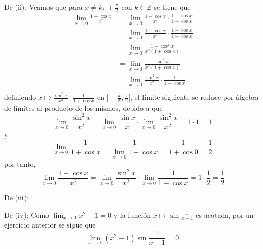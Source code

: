 \documentclass[12pt]{article}
\begin{document}
\begin{enumerate}
\begin{sol}
        De (ii): Veamos que para $x\neq k\pi+\frac{\pi}{2}$ con $k\in\mathbb{Z}$ se tiene que
        \begin{equation*}
            \begin{split}
                \lim_{x\rightarrow 0}\frac{1-\cos x}{x^2}&=\lim_{x\rightarrow 0}\frac{1-\cos x}{x^2}\cdot\frac{1+\cos x}{1+\cos x}\\
                &=\lim_{x\rightarrow 0}\frac{1-\cos x}{x^2}\cdot\frac{1+\cos x}{1+\cos x}\\
                &=\lim_{x\rightarrow 0}\frac{1-\cos^2 x}{x^2(1+\cos x)}\\
                &=\lim_{x\rightarrow 0}\frac{\sin^2 x}{x^2(1+\cos x)}\\
                &=\lim_{x\rightarrow 0}\frac{\sin^2 x}{x^2}\cdot\frac{1}{1+\cos x} \\
            \end{split}
        \end{equation*}
        definiendo $x\mapsto \frac{\sin^ 2 x}{x^2}\cdot\frac{1}{1+\cos x}$ en $]-\frac{\pi}{2},\frac{\pi}{2}[$, el límite siguiente se reduce por álgebra de límites al producto de los mismos, debido a que
        \begin{equation*}
            \lim_{x\rightarrow 0}\frac{\sin^2 x}{x^2}=\lim_{x\rightarrow 0}\frac{\sin x}{x}\cdot\lim_{x\rightarrow 0}\frac{\sin^2 x}{x^2}=1\cdot 1 =1
        \end{equation*}
        y
        \begin{equation*}
            \lim_{x\rightarrow 0}\frac{1}{1+\cos x}=\frac{1}{\lim_{x\rightarrow 0}1+\cos x }=\frac{1}{1+\cos0 }=\frac{1}{2}
        \end{equation*}
        por tanto,
        \begin{equation*}
            \lim_{x\rightarrow 0}\frac{1-\cos x}{x^2}=\lim_{x\rightarrow 0}\frac{\sin^2 x}{x^2}\cdot\lim_{ x\rightarrow 0}\frac{1}{1+\cos x}=1\cdot\frac{1}{2}=\frac{1}{2}
        \end{equation*}

        De (iii): 

        De (iv): Como $\lim_{ x\rightarrow 1}x^2-1=0$ y la función $x\mapsto\sin\frac{1}{x-1}$ es acotada, por un ejercicio anterior se sigue que
        \begin{equation*}
            \lim_{ x\rightarrow 1}(x^2-1)\sin\frac{1}{x-1}=0
        \end{equation*}


\end{sol}
\end{enumerate}
\end{document}
